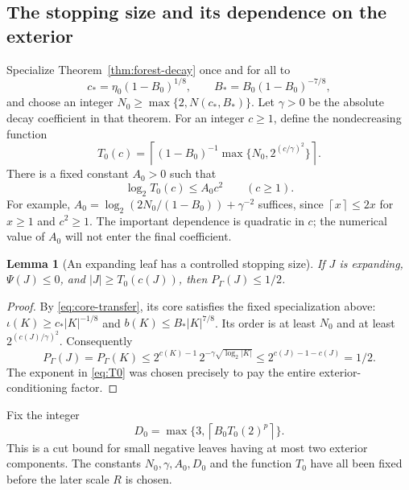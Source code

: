 \documentclass[11pt,a4paper]{article}
\numberwithin{equation}{section}
\newtheorem{lemma}[theorem]{Lemma}
\theoremstyle{definition}
\theoremstyle{remark}
\newcommand{\ceil}[1]{\left\lceil#1\right\rceil}
\begin{document}
\subsection{The stopping size and its dependence on the exterior}
Specialize Theorem~\ref{thm:forest-decay} once and for all to
\[
 c_*=\eta_0(1-B_0)^{1/8},\qquad B_*=B_0(1-B_0)^{-7/8},
\]
and choose an integer $N_0\ge\max\{2,N(c_*,B_*)\}$. Let $\gamma>0$ be the absolute decay coefficient in that theorem. For an integer $c\ge1$, define the nondecreasing function
\begin{equation}\label{eq:T0}
 T_0(c)=\ceil{(1-B_0)^{-1}
              \max\{N_0,2^{(c/\gamma)^2}\}}.
\end{equation}
There is a fixed constant $A_0>0$ such that
\begin{equation}\label{eq:T0-growth}
 \log_2 T_0(c)\le A_0c^2\qquad(c\ge1).
\end{equation}
For example, $A_0=\log_2(2N_0/(1-B_0))+\gamma^{-2}$ suffices, since $\ceil{x}\le2x$ for $x\ge1$ and $c^2\ge1$. The important dependence is quadratic in $c$; the numerical value of $A_0$ will not enter the final coefficient.

\begin{lemma}[An expanding leaf has a controlled stopping size]\label{lem:analytic-stop}
If $J$ is expanding, $\Psi(J)\le0$, and $|J|\ge T_0(c(J))$, then $P_\Gamma(J)\le1/2$.
\end{lemma}
\begin{proof}
By \eqref{eq:core-transfer}, its core satisfies the fixed specialization above:
$\iota(K)\ge c_*|K|^{-1/8}$ and $b(K)\le B_*|K|^{7/8}$. Its order is at least $N_0$ and at least $2^{(c(J)/\gamma)^2}$. Consequently
\[
 P_\Gamma(J)=P_\Gamma(K)
 \le2^{c(K)-1}\,2^{-\gamma\sqrt{\log_2|K|}}
 \le2^{c(J)-1-c(J)}=1/2.
\]
The exponent in \eqref{eq:T0} was chosen precisely to pay the entire exterior-conditioning factor.
\end{proof}

Fix the integer
\begin{equation}\label{eq:D0}
 D_0=\max\{3,\ceil{B_0T_0(2)^p}\}.
\end{equation}
This is a cut bound for small negative leaves having at most two exterior components. The constants $N_0,\gamma,A_0,D_0$ and the function $T_0$ have all been fixed before the later scale $R$ is chosen.
\end{document}
